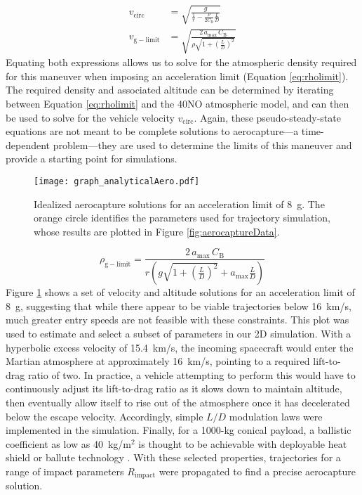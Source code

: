 \documentclass[final,3p,times,twocolumn,sort&compress, lefttitle]{elsarticle}
\begin{document}
                \begin{align}
                    v_\mathrm{circ}&=\sqrt{\frac{g}{\frac{1}{r}-\frac{\rho}{2C_\mathrm{B}}\frac{L}{D}}}\label{eq:vcirc}\\
                    v_\mathrm{g-limit}&= \sqrt{\frac{2\,a_\mathrm{max}\,C_\mathrm{B}}{\rho\sqrt{1+\left(\frac{L}{D}\right)^2}}}\label{eq:vglimit}
                \end{align}
                Equating both expressions allows us to solve for the atmospheric density required for this maneuver when imposing an acceleration limit (Equation \ref{eq:rholimit}). The required density and associated altitude can be determined by iterating between Equation \ref{eq:rholimit} and the 40NO atmospheric model, and can then be used to solve for the vehicle velocity $v_\mathrm{circ}$. Again, these pseudo-steady-state equations are not meant to be complete solutions to aerocapture---a time-dependent problem---they are used to determine the limits of this maneuver and provide a starting point for simulations.
                
                \begin{figure}[h]
                    \centering
                    \texttt{[image: graph\_analyticalAero.pdf]}
                    \caption{Idealized aerocapture solutions for an acceleration limit of 8~g. The orange circle identifies the parameters used for trajectory simulation, whose results are plotted in Figure \ref{fig:aerocaptureData}.}
                    \label{fig:aerocapturePlot}
                \end{figure}
                
                \begin{equation}
                    \rho_\mathrm{g-limit} = \frac{2\,a_\mathrm{max}\,C_\mathrm{B}}{r\left(g\sqrt{1+\left(\frac{L}{D}\right)^2}+a_\mathrm{max}\frac{L}{D}\right)}
                    \label{eq:rholimit}
                \end{equation}
                Figure \ref{fig:aerocapturePlot} shows a set of velocity and altitude solutions for an acceleration limit of 8~g, suggesting that while there appear to be viable trajectories below 16~km/s, much greater entry speeds are not feasible with these constraints. This plot was used to estimate and select a subset of parameters in our 2D simulation. With a hyperbolic excess velocity of 15.4~km/s, the incoming spacecraft would enter the Martian atmosphere at approximately 16~km/s, pointing to a required lift-to-drag ratio of two. In practice, a vehicle attempting to perform this would have to continuously adjust its lift-to-drag ratio as it slows down to maintain altitude, then eventually allow itself to rise out of the atmosphere once it has decelerated below the escape velocity. Accordingly, simple $L/D$ modulation laws were implemented in the simulation. Finally, for a 1000-kg conical payload, a ballistic coefficient as low as 40~kg/m$^2$ is thought to be achievable with deployable heat shield \cite{cassell_adept_2018} or ballute technology \cite{rohrschneider_survey_2007}. With these selected properties, trajectories for a range of impact parameters $R_\mathrm{impact}$ were propagated to find a precise aerocapture solution.
            
\end{document}
